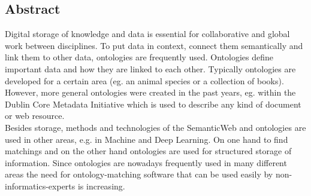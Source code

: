 %
\pagestyle{empty}

\subsection*{Abstract}

Digital storage of knowledge and data is essential for collaborative and global
work between disciplines. To put data in context, connect them semantically and
link them to other data, ontologies are frequently used. Ontologies define
important data and how they are linked to each other. Typically ontologies are
developed for a certain area (eg. an animal species or a collection of books).
However, more general ontologies were created in the past years, eg. within the
Dublin Core Metadata Initiative which is used to describe any kind of document
or web resource.\\
Besides storage, methods and technologies of the SemanticWeb and ontologies are
used in other areas, e.g. in Machine and Deep Learning. On one hand to find
matchings and on the other hand ontologies are used for structured storage of
information. Since ontologies are nowadays frequently used in many different
areas the need for ontology-matching software that can be used easily by
non-informatics-experts is increasing.

